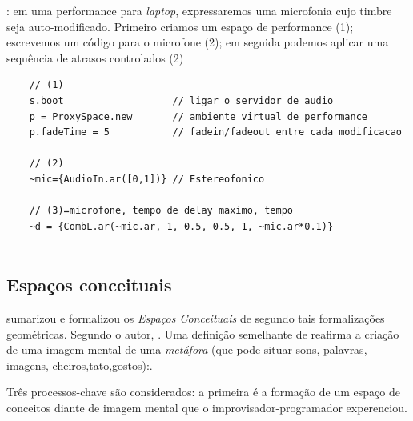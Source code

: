 \begin{example}

: em uma performance para \emph{laptop}, expressaremos uma microfonia cujo timbre seja auto-modificado. Primeiro criamos um espaço de performance (1); escrevemos um código para o microfone (2); em seguida podemos aplicar uma sequência de atrasos controlados (2)

  \begin{verbatim}
    // (1) 
    s.boot                   // ligar o servidor de audio
    p = ProxySpace.new       // ambiente virtual de performance 
    p.fadeTime = 5           // fadein/fadeout entre cada modificacao

    // (2)
    ~mic={AudioIn.ar([0,1])} // Estereofonico

    // (3)=microfone, tempo de delay maximo, tempo 
    ~d = {CombL.ar(~mic.ar, 1, 0.5, 0.5, 1, ~mic.ar*0.1)}
    
  \end{verbatim}
\end{example}




\subsection{Espaços conceituais}\label{sec:componentes}

  sumarizou e formalizou os \emph{Espaços Conceituais} de  segundo tais formalizações geométricas. Segundo o autor, . Uma definição semelhante de  reafirma a criação de uma imagem mental de uma \emph{metáfora} (que pode situar sons, palavras, imagens, cheiros,tato,gostos):. 

Três processos-chave são considerados: a primeira é a formação de um espaço de conceitos diante de imagem mental que o improvisador-programador experenciou. 


